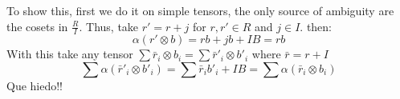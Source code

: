 \begin{description}
\begin{enumerate}[(a)]
            To show this, first we do it on simple tensors, the only source of ambiguity are the cosets in $\frac RI$. Thus, take $r'=r+j$ for $r,r' \in R$ and $j\in I$. then:
            $$ \alpha(r'\otimes b) = rb + jb + IB = rb$$
            With this take any tensor $\sum \bar r_i\otimes b_i=\sum \bar r'_i\otimes b'_i$ where $\bar r = r + I$
            $$\sum \alpha(\bar r'_i\otimes b'_i)=\sum  \bar r_i b'_i + IB = \sum\alpha(\bar r_i \otimes b_i) $$ 
Que hiedo!!            

    \end{enumerate}
\end{description}
